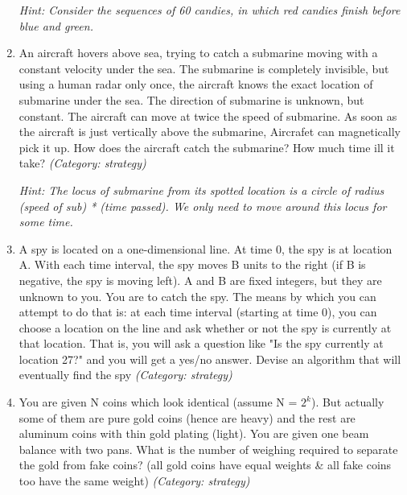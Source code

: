 \begin{enumerate}
\small\emph{Hint: Consider the sequences of 60 candies, in which red candies finish before blue and green.}





\item An aircraft hovers above sea, trying to catch a submarine moving with a constant velocity under the sea. The submarine is completely invisible, but using a human radar only once, the aircraft knows the exact location of submarine under the sea. The direction of submarine is unknown, but constant. The aircraft can move at twice the speed of submarine. As soon as the aircraft is just vertically above the submarine, Aircrafet can magnetically pick it up. How does the aircraft catch the submarine? How much time ill it take?
\small\emph{(Category: strategy)}

\small\emph{Hint: The locus of submarine from its spotted location is a circle of radius (speed of sub) * (time passed). We only need to move around this locus for some time.}





\item A spy is located on a one-dimensional line.  At time 0, the spy is at location A.  With each time interval, the spy moves B units to the right (if B is negative, the spy is moving left).  A and B are fixed integers, but they are unknown to you.  You are to catch the spy.  The means by which you can attempt to do that is:  at each time interval (starting at time 0), you can choose a location on the line and ask whether or not the spy is currently at that location.  That is, you will ask a question like "Is the spy currently at location 27?" and you will get a yes/no answer.  Devise an algorithm that will eventually find the spy
\small\emph{(Category: strategy)}




\item You are given N coins which look identical (assume N = $2^k$). But actually some of them are pure gold coins (hence are heavy) and the rest are aluminum coins with thin gold plating (light). You are given one beam balance with two pans. What is the number of weighing required to separate the gold from fake coins? (all gold coins have equal weights \& all fake coins too have the same weight)
\small\emph{(Category: strategy)}


\end{enumerate}
